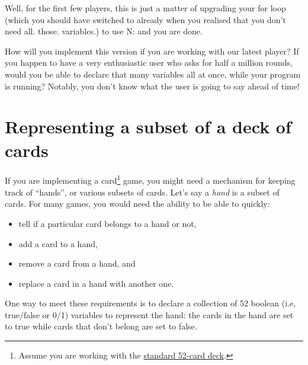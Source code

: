 \documentclass[
  letterpaper,
  DIV=11,
  numbers=noendperiod]{scrreprt}
\providecommand{\tightlist}{%
  \setlength{\itemsep}{0pt}\setlength{\parskip}{0pt}}\usepackage{longtable,booktabs,array}
\begin{document}
Well, for the first few players, this is just a matter of upgrading your
for loop (which you should have switched to already when you realised
that you don't need all. those. variables.) to use N: and you are done.

\begin{tcolorbox}[standard jigsaw,titlerule=0mm, leftrule=.75mm, colbacktitle=quarto-callout-caution-color!10!white, toptitle=1mm, toprule=.15mm, colframe=quarto-callout-caution-color-frame, colback=white, coltitle=black, title=\textcolor{quarto-callout-caution-color}{\faFire}\hspace{0.5em}{Food for thought.}, bottomrule=.15mm, rightrule=.15mm, bottomtitle=1mm, left=2mm, opacitybacktitle=0.6, arc=.35mm, opacityback=0]
How will you implement this version if you are working with our latest
player? If you happen to have a very enthusiastic user who asks for half
a million rounds, would you be able to declare that many variables all
at once, while your program is running? Notably, you don't know what the
user is going to say ahead of time!
\end{tcolorbox}

\hypertarget{representing-a-subset-of-a-deck-of-cards}{%
\section{Representing a subset of a deck of
cards}\label{representing-a-subset-of-a-deck-of-cards}}

If you are implementing a card\footnote{Assume you are working with the
  \href{https://en.wikipedia.org/wiki/Standard_52-card_deck}{standard
  52-card deck}.} game, you might need a mechanism for keeping track of
``hands'', or various subsets of cards. Let's say a \emph{hand} is a
subset of cards. For many games, you would need the ability to be able
to quickly:

\begin{itemize}
\tightlist
\item
  tell if a particular card belongs to a hand or not,
\item
  add a card to a hand,
\item
  remove a card from a hand, and
\item
  replace a card in a hand with another one.
\end{itemize}

One way to meet these requirements is to declare a collection of 52
boolean (i.e, true/false or 0/1) variables to represent the hand: the
cards in the hand are set to true while cards that don't belong are set
to false.
\end{document}
